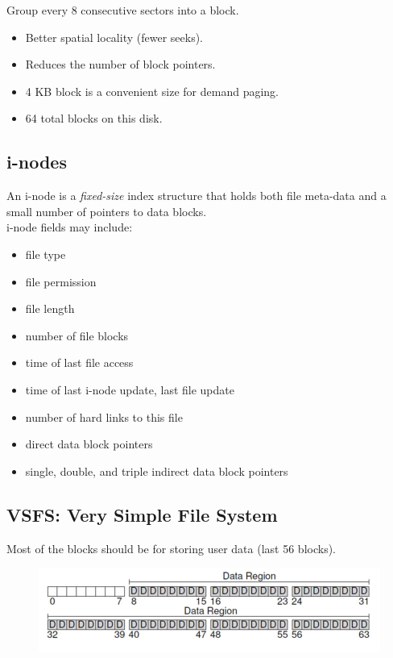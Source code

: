 \documentclass[12pt]{article}
\theoremstyle{plain}
\theoremstyle{definition}
\begin{document}
Group every 8 consecutive sectors into a block.
\begin{itemize}
  \item Better spatial locality (fewer seeks).
  \item Reduces the number of block pointers.
  \item 4 KB block is a convenient size for demand paging.
  \item 64 total blocks on this disk.
\end{itemize}

\subsection{i-nodes}
An i-node is a \emph{fixed-size} index structure that holds both file meta-data and a small number of pointers to data blocks. \\
i-node fields may include:
\begin{itemize}
  \item file type
  \item file permission
  \item file length
  \item number of file blocks
  \item time of last file access
  \item time of last i-node update, last file update
  \item number of hard links to this file
  \item direct data block pointers
  \item single, double, and triple indirect data block pointers
\end{itemize}

\subsection{VSFS: Very Simple File System}
Most of the blocks should be for storing user data (last 56 blocks).
\begin{figure}[H]
  \centering
  \includegraphics[scale=0.8]{pictures/vsfs_1.png}
\end{figure}
\end{document}
